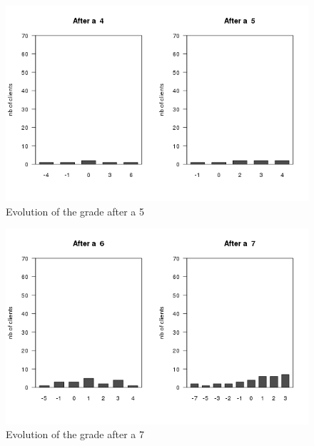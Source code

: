 \documentclass[a4paper, 11pt]{article}
\begin{document}
        \begin{figure}[!ht]
                \centering
                \includegraphics[height = 10 cm]{Remi/Evolution_of_the_grade_after_a_5.png}
                \caption{Evolution of the grade after a 5}
                \label{fig:e_5}
        \end{figure}

        \begin{figure}[!ht]
                \centering
                \includegraphics[height = 10 cm]{Remi/Evolution_of_the_grade_after_a_7.png}
                \caption{Evolution of the grade after a 7}
                \label{fig:e_7}
        \end{figure}
\end{document}

